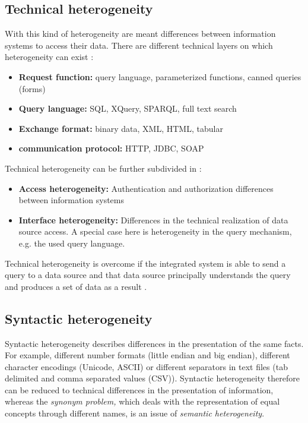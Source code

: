 \subsection{Technical  heterogeneity}
With this kind of heterogeneity are meant differences between information systems to access their data. There are different technical layers on which heterogeneity can exist \cite[p. 62]{DBLP:books/dp/LeserN2006}:
\begin{itemize}
\item \textbf{Request function:} query language, parameterized  functions, canned queries (forms)
\item \textbf{Query language:} SQL, XQuery, SPARQL, full text search
\item \textbf{Exchange format:} binary data, XML, HTML, tabular
\item \textbf{communication protocol:} HTTP, JDBC, SOAP
\end{itemize}

Technical heterogeneity can be further subdivided in \cite[p. 64]{DBLP:books/dp/LeserN2006}: \label{technical_heterogeneity_subtypes}
\begin{itemize}
\item \textbf{Access heterogeneity:} Authentication and authorization differences between information systems
\item \textbf{Interface heterogeneity:} Differences in the technical realization of data source access. A special case here is heterogeneity in the query mechanism, e.g. the used query language.
\end{itemize}

Technical  heterogeneity is overcome if the integrated system is able to send a query to a data source and that data source principally understands the query and produces a set of data as a result \cite[p. 61]{DBLP:books/dp/LeserN2006}.

\subsection{Syntactic  heterogeneity}
Syntactic heterogeneity describes differences in the presentation of the same facts\cite[p. 64]{DBLP:books/dp/LeserN2006}. For example, different number formats (little endian and big endian), different character encodings (Unicode, ASCII) or different separators in text files (tab delimited and comma separated values (CSV)). Syntactic heterogeneity therefore can be reduced to technical differences in the presentation of information, whereas the \textit{synonym problem,} which deals with the representation of equal concepts through different names, is an issue of \textit{semantic heterogeneity}.

